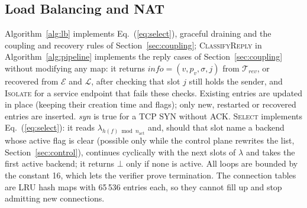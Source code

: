 \documentclass[conference]{IEEEtran}
\begin{document}
\subsection{Load Balancing and NAT}
Algorithm~\ref{alg:lb} implements Eq.~(\ref{eq:select}), graceful draining and
the coupling and recovery rules of Section~\ref{sec:coupling};
\textsc{ClassifyReply} in Algorithm~\ref{alg:pipeline} implements the reply
cases of Section~\ref{sec:coupling} without modifying any map: it returns
$\textit{info}=(v,p_v,\sigma,j)$ from $\mathcal{T}_{rev}$, or recovered from
$\mathcal{E}$ and $\mathcal{L}$, after checking that slot $j$ still holds the
sender, and \textsc{Isolate} for a service endpoint that fails these checks.
Existing entries are updated in place (keeping their creation time and
flags); only new, restarted or recovered entries are inserted. \textit{syn}
is true for a TCP SYN without ACK. \textsc{Select} implements
Eq.~(\ref{eq:select}): it reads $\lambda_{h(f) \bmod n_{\mathrm{act}}}$ and,
should that slot name a backend whose active flag is clear (possible only
while the control plane rewrites the list, Section~\ref{sec:control}),
continues cyclically with the next slots of $\lambda$ and takes the first
active backend; it returns $\bot$ only if none is active. All loops are bounded by the
constant 16, which lets the verifier prove termination. The connection tables
are LRU hash maps with 65\,536 entries each, so they cannot fill up and stop
admitting new connections.
\end{document}
